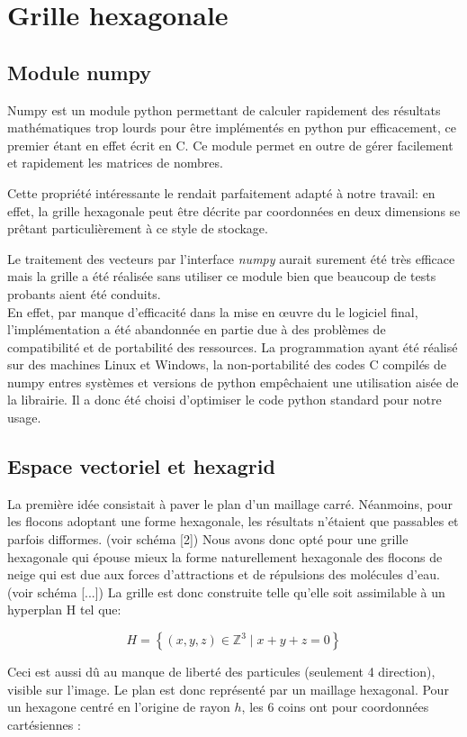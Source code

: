 \documentclass[a4paper,12pt,twoside]{report}
\begin{document}
\section{Grille hexagonale}
\subsection{Module numpy}Numpy est un module python permettant de calculer rapidement des résultats mathématiques trop lourds pour être implémentés en python pur efficacement, ce premier étant en effet écrit en C. Ce module permet en outre de gérer facilement et rapidement les matrices de nombres. 

Cette propriété intéressante le rendait parfaitement adapté à notre travail: en effet, la grille hexagonale peut être décrite par coordonnées en deux dimensions se prêtant particulièrement à ce style de stockage. 

Le traitement des vecteurs par l'interface \emph{numpy} aurait surement été très efficace mais la grille a été réalisée sans utiliser ce module bien que beaucoup de tests probants aient été conduits.\\En effet, par manque d'efficacité dans la mise en œuvre du le logiciel final, l'implémentation a été abandonnée en partie due à des problèmes de compatibilité et de portabilité des ressources. La programmation ayant été réalisé sur des machines Linux et Windows, la non-portabilité des codes C compilés de numpy entres systèmes et versions de python empêchaient une utilisation aisée de la librairie.
\medbreak
Il a donc été choisi d'optimiser le code python standard pour notre usage.

\subsection{Espace vectoriel et hexagrid}La première idée consistait à paver le plan d’un maillage carré. Néanmoins, pour les flocons adoptant une forme hexagonale, les résultats n’étaient que passables et parfois difformes. (voir schéma [2]) Nous avons donc opté pour une grille hexagonale qui épouse mieux la forme naturellement hexagonale des flocons de neige qui est due aux forces d'attractions et de répulsions des molécules d'eau. (voir schéma [...])
\medbreak
La grille est donc construite telle qu'elle soit assimilable à un hyperplan H tel que:

$$H=\left \{(x,y,z)\in\mathbb{Z}^3\mid x+y+z=0 \right \}$$

Ceci est aussi dû au manque de liberté des particules (seulement 4 direction), visible sur l’image.
Le plan est donc représenté par un maillage hexagonal.
Pour un hexagone centré en l’origine de rayon $h$, les 6 coins ont pour coordonnées cartésiennes :
\end{document}
